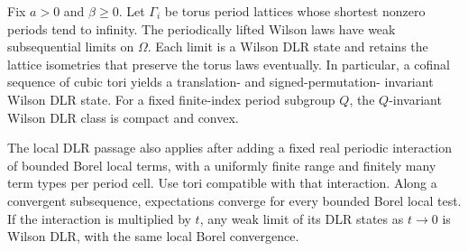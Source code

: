 \documentclass[11pt,letterpaper,reqno]{amsart}
\makeatletter
\numberwithin{equation}{section}
\theoremstyle{definition}
\newcommand{\ms@minorstart}{%
  \pushQED{\qed}\renewcommand{\qedsymbol}{$\blacksquare$}}
\newenvironment{lemma}[1][]{\ms@minorstart\ms@lemma[#1]}
  {\popQED\endms@lemma}
\theoremstyle{remark}
\makeatother
\begin{document}
\begin{lemma}[Local Gibbs limits]\label{lem:lp-compactness}
Fix \(a>0\) and \(\beta\ge0\). Let \(\Gamma_i\) be torus period lattices
whose shortest nonzero periods tend to infinity. The periodically
lifted Wilson laws have weak subsequential limits on \(\Omega\).
Each limit is a Wilson DLR state and retains the lattice isometries
that preserve the torus laws eventually. In particular, a cofinal
sequence of cubic tori yields a translation- and signed-permutation-
invariant Wilson DLR state. For a fixed finite-index period subgroup
\(Q\), the \(Q\)-invariant Wilson DLR class is compact and convex.

The local DLR passage also applies after adding a fixed real
periodic interaction of bounded Borel local terms, with a
uniformly finite range and finitely many term types per period cell.
Use tori compatible with that interaction. Along a convergent
subsequence, expectations converge for every bounded Borel local
test. If the interaction is multiplied by \(t\), any weak limit
of its DLR states as \(t\to0\) is Wilson DLR, with the same local
Borel convergence.
\end{lemma}
\end{document}
